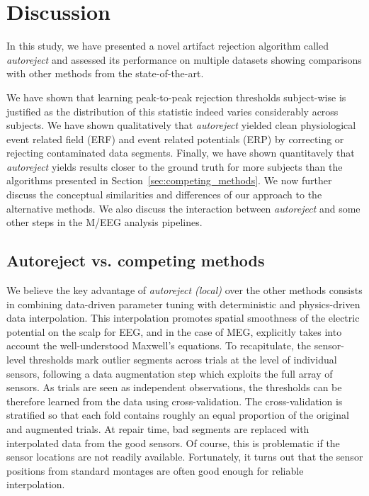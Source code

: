 \section{Discussion}
\label{sec:discussion}

In this study, we have presented a novel artifact rejection algorithm called \emph{autoreject} and assessed its performance on multiple datasets showing comparisons with other methods from the state-of-the-art.


We have shown that learning peak-to-peak rejection thresholds subject-wise is justified as the distribution of this statistic indeed varies considerably across subjects. We have shown qualitatively that \emph{autoreject} yielded clean physiological event related field (ERF) and event related potentials (ERP) by correcting or rejecting contaminated data segments. Finally, we have shown quantitavely that \emph{autoreject} yields results closer to the ground truth for more subjects than the algorithms presented in Section~\ref{sec:competing_methods}. We now further discuss the conceptual similarities and differences of our approach to the alternative methods. We also discuss the interaction between \emph{autoreject}
and some other steps in the M/EEG analysis pipelines.

\subsection{Autoreject vs. competing methods}

We believe the key advantage of \emph{autoreject (local)} over the other methods consists in combining data-driven parameter tuning with deterministic and physics-driven data interpolation. This interpolation promotes spatial smoothness of the electric potential on the scalp for EEG, and in the case of MEG, explicitly takes into account the well-understood Maxwell's equations. To recapitulate, the sensor-level thresholds mark outlier segments across trials at the level of individual sensors, following a data augmentation step which exploits the full array of sensors. As trials are seen as independent observations, the thresholds can be therefore learned from the data using cross-validation. The cross-validation is stratified so that each fold contains roughly an equal proportion of the original and augmented trials. At repair time, bad segments are replaced with interpolated data from the good sensors. Of course, this is problematic if the sensor locations are not readily available. Fortunately, it turns out that the sensor positions from standard montages are often good enough for reliable interpolation.

